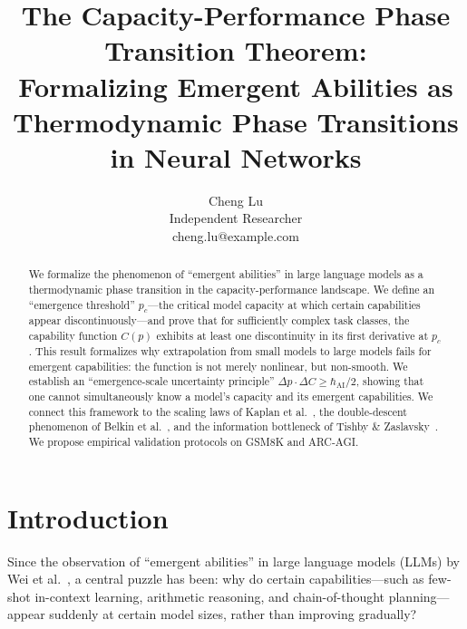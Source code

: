 \documentclass[12pt]{article}
\theoremstyle{definition}
\theoremstyle{remark}
\begin{document}
\title{The Capacity-Performance Phase Transition Theorem: \\ Formalizing Emergent Abilities as Thermodynamic Phase Transitions in Neural Networks}

\author{Cheng Lu\\
Independent Researcher\\
cheng.lu@example.com}

\date{}

\maketitle

\begin{abstract}
We formalize the phenomenon of ``emergent abilities'' in large language models as a thermodynamic phase transition in the capacity-performance landscape. We define an ``emergence threshold'' $p_c$---the critical model capacity at which certain capabilities appear discontinuously---and prove that for sufficiently complex task classes, the capability function $C(p)$ exhibits at least one discontinuity in its first derivative at $p_c$. This result formalizes why extrapolation from small models to large models fails for emergent capabilities: the function is not merely nonlinear, but non-smooth. We establish an ``emergence-scale uncertainty principle'' $\Delta p \cdot \Delta C \geq \hbar_{\text{AI}}/2$, showing that one cannot simultaneously know a model's capacity and its emergent capabilities. We connect this framework to the scaling laws of Kaplan et al.~\cite{kaplan2020scaling}, the double-descent phenomenon of Belkin et al.~\cite{belkin2019reconciling}, and the information bottleneck of Tishby \& Zaslavsky~\cite{tishby2015information}. We propose empirical validation protocols on GSM8K and ARC-AGI.
\end{abstract}

\section{Introduction}

Since the observation of ``emergent abilities'' in large language models (LLMs) by Wei et al.~\cite{wei2022emergent}, a central puzzle has been: why do certain capabilities---such as few-shot in-context learning, arithmetic reasoning, and chain-of-thought planning---appear suddenly at certain model sizes, rather than improving gradually?
\end{document}
